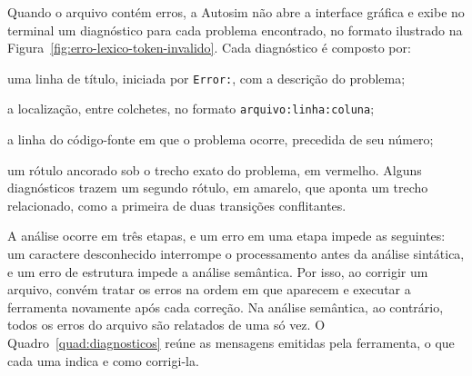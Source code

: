\documentclass[
    12pt
    ,oneside
    ,a4paper
    ,chapter=TITLE
    ,section=TITLE
    ,sumario=abnt-6027-2012]{abntex2}
\begin{document}

Quando o arquivo contém erros, a Autosim não abre a interface gráfica e exibe no
terminal um diagnóstico para cada problema encontrado, no formato ilustrado na
Figura~\ref{fig:erro-lexico-token-invalido}. Cada diagnóstico é composto por:

\begin{alineas}
    \item uma linha de título, iniciada por \texttt{Error:}, com a descrição do problema;
    \item a localização, entre colchetes, no formato \texttt{arquivo:linha:coluna};
    \item a linha do código-fonte em que o problema ocorre, precedida de seu número;
    \item um rótulo ancorado sob o trecho exato do problema, em vermelho. Alguns
    diagnósticos trazem um segundo rótulo, em amarelo, que aponta um trecho relacionado,
    como a primeira de duas transições conflitantes.
\end{alineas}

A análise ocorre em três etapas, e um erro em uma etapa impede as seguintes: um
caractere desconhecido interrompe o processamento antes da análise sintática, e um
erro de estrutura impede a análise semântica. Por isso, ao corrigir um arquivo, convém
tratar os erros na ordem em que aparecem e executar a ferramenta novamente após cada
correção. Na análise semântica, ao contrário, todos os erros do arquivo são relatados de
uma só vez. O Quadro~\ref{quad:diagnosticos} reúne as mensagens emitidas pela ferramenta,
o que cada uma indica e como corrigi-la.
\end{document}
